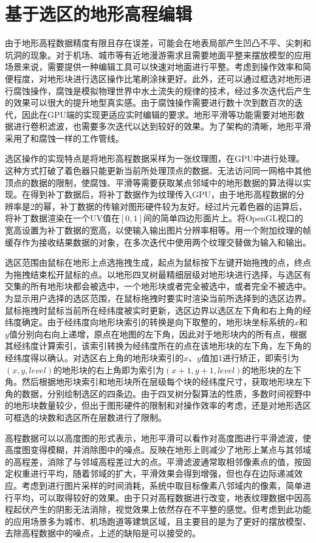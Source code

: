 \section{基于选区的地形高程编辑}
由于地形高程数据精度有限且存在误差，可能会在地表局部产生凹凸不平、尖刺和坑洞的现象。对于机场、城市等有近地漫游需求且需要地面平整来摆放模型的应用场景来说，需要提供一种编辑工具可以快速对地面进行平整。考虑到操作效率和简便程度，对地形块进行选区操作比笔刷涂抹更好。此外，还可以通过框选对地形进行腐蚀操作，腐蚀是模拟物理世界中水土流失的规律的技术，经过多次迭代后产生的效果可以很大的提升地型真实感。由于腐蚀操作需要进行数十次到数百次的迭代，因此在GPU端的实现更适应实时编辑的要求。地形平滑等功能需要对地形数据进行卷积滤波，也需要多次迭代以达到较好的效果。为了架构的清晰，地形平滑采用了和腐蚀一样的工作管线。\par
选区操作的实现特点是将地形高程数据采样为一张纹理图，在GPU中进行处理。这种方式打破了着色器只能更新当前所处理顶点的数据、无法访问同一网格中其他顶点的数据的限制，使腐蚀、平滑等需要获取某点邻域中的地形数据的算法得以实现。在得到补丁数据后，将补丁数据作为纹理传入GPU，由于地形高程数据的分辨率是2的幂，补丁数据的传输对图形硬件较为友好。经过片元着色器的运算后，将补丁数据渲染在一个UV值在$[0,1]$间的简单四边形面片上。将OpenGL视口的宽高设置为补丁数据的宽高，以使输入输出图片分辨率相等。用一个附加纹理的帧缓存作为接收结果数据的对象，在多次迭代中使用两个纹理交替做为输入和输出。\par
选区范围由鼠标在地形上点选拖拽生成，起点为鼠标按下左键开始拖拽的点，终点为拖拽结束松开鼠标的点。以地形四叉树最精细层级对地形块进行选择，与选区有交集的所有地形块都会被选中，一个地形块或者完全被选中，或者完全不被选中。为显示用户选择的选区范围，在鼠标拖拽时要实时渲染当前所选择到的选区边界。鼠标拖拽时鼠标当前所在经纬度被实时更新，选区边界以选区左下角和右上角的经纬度确定。由于经纬度向地形块索引的转换是向下取整的，地形块坐标系统的$x$和$y$值分别向右向上递增，原点在地图的左下角，因此对于地形块内的所有点，根据其经纬度计算索引，该索引转换为经纬度所在的点在该地形块的左下角，左下角的经纬度得以确认。对选区右上角的地形块索引的$x$、$y$值加1进行矫正，即索引为$(x,y,level)$的地形块的右上角即为索引为$(x+1,y+1,level)$的地形块的左下角。然后根据地形块索引和地形块所在层级每个块的经纬度尺寸，获取地形块左下角的数据，分别绘制选区的四条边。由于四叉树分裂算法的性质，多数时间视野中的地形块数量较少，但出于图形硬件的限制和对操作效率的考虑，还是对地形选区可框选的块数和选区所在层数进行了限制。\par
高程数据可以以高度图的形式表示，地形平滑可以看作对高度图进行平滑滤波，使高度图变得模糊，并消除图中的噪点。反映在地形上则减少了地形上某点与其邻域的高程差，消除了与邻域高程差过大的点。平滑滤波通常取相邻像素点的值，按固定权重进行平均，随着邻域的扩大，平滑效果会得到增强，但也存在边际递减效应。考虑到进行图片采样的时间消耗，系统中取目标像素八邻域内的像素，简单进行平均，可以取得较好的效果。由于只对高程数据进行改变，地表纹理数据中因高程起伏产生的阴影无法消除，视觉效果上依然存在不平整的感觉。但考虑到此功能的应用场景多为城市、机场跑道等建筑区域，且主要目的是为了更好的摆放模型、去除高程数据中的噪点，上述的缺陷是可以接受的。



